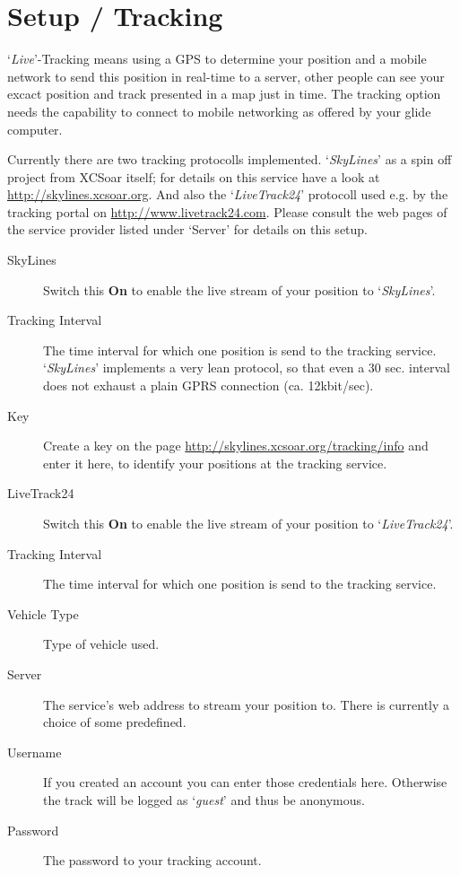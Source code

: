 \section{Setup / Tracking}

`{\it Live}'-Tracking means using a GPS to determine your position and a mobile 
network to send this position in real-time to a server, other people can see 
your excact position and track presented in a map just in time.
The tracking option needs the capability to connect to mobile networking as offered by 
your glide computer.

Currently there are two tracking protocolls implemented. `{\em SkyLines}' as a spin 
off project from XCSoar itself; for details on this service have a look at 
\url{http://skylines.xcsoar.org}. 
And also the `{\em LiveTrack24}' protocoll used e.g. by the tracking 
portal on \url{http://www.livetrack24.com}.  
Please consult the web pages of the service provider listed under `Server' 
for details on this setup.

\begin{description}
\item[SkyLines]  Switch this {\bf On} to enable the live stream of 
  your position to `{\em SkyLines}'.
\item[Tracking Interval]  The time interval for which one position is send to 
  the tracking service. `{\em SkyLines}' implements a very lean protocol, so that even
  a 30 sec. interval does not exhaust a plain GPRS connection (ca. 12kbit/sec). 
\item[Key]  Create a key on the page \url{http://skylines.xcsoar.org/tracking/info} 
  and enter it here, to identify your positions at the tracking service.
\\
\item[LiveTrack24]  Switch this {\bf On} to enable the live stream of 
  your position to `{\em LiveTrack24}'.
\item[Tracking Interval]  The time interval for which one position is send to 
  the tracking service.
\item[Vehicle Type]  Type of vehicle used.
\item[Server]  The service's web address to stream your position to. There is currently 
  a choice of some predefined.
\item[Username]  If you created an account you can enter those credentials here. 
  Otherwise the track will be logged as `{\it guest}' and thus be anonymous.  
\item[Password]  The password to your tracking account.
\end{description}

